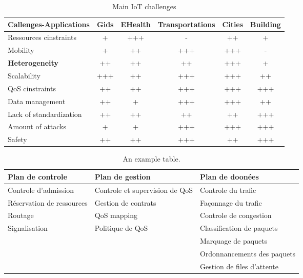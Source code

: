 \begin{table}[h!]
\scriptsize
	\begin{tabulary}{\textwidth}{L|C|C|C|C|C}
	Callenges-Applications  & Gids & EHealth & Transportations & Cities & \textbf{Building}\\\hline
	Ressources cinstraints  & +           & +++     & -               & ++           & +            \\\hline
	Mobility                & +           & ++      & +++             & +++          & -            \\\hline
	\textbf{Heterogeneity}  & ++          & ++      & ++              & +++          & +            \\\hline
	Scalability             & +++         & ++      & +++             & +++          & ++           \\\hline
	QoS cinstraints         & ++          & ++      & +++             & +++          & +++          \\\hline
	Data management         & ++          & +       & +++             & +++          & ++           \\\hline
	Lack of standardization & ++          & ++      & ++              & ++           & +++          \\\hline
	Amount of attacks       & +           & +       & +++             & +++          & +++          \\\hline
	Safety                  & ++          & ++      & +++             & ++           & +++          \\\hline
	\end{tabulary}
\caption{\label{tab:iot_challenges} Main IoT challenges\cite{kouicem_internet_2018}}
\end{table}

\begin{table}[h!]
\scriptsize
	\begin{tabulary}{\textwidth}{L|L|L}
		\textbf{Plan de controle}   & \textbf{Plan de gestion}   & 	\textbf{Plan de doonées}  \\\hline
	Controle d'admission      & Controle et supervision de QoS & Controle du trafic         \\
	Réservation de ressources & Gestion de contrats            & Façonnage du trafic        \\
	Routage                   & QoS mapping                    & Controle de congestion     \\
	Signalisation             & Politique de QoS               & Classification de paquets  \\
	\                         &                                & Marquage de paquets        \\
	\                         &                                & Ordonnancements des paquets\\
	\                         &                                & Gestion de files d'attente \\
	\end{tabulary}
	\caption{\label{tab:qos} An example table.}
\end{table}

